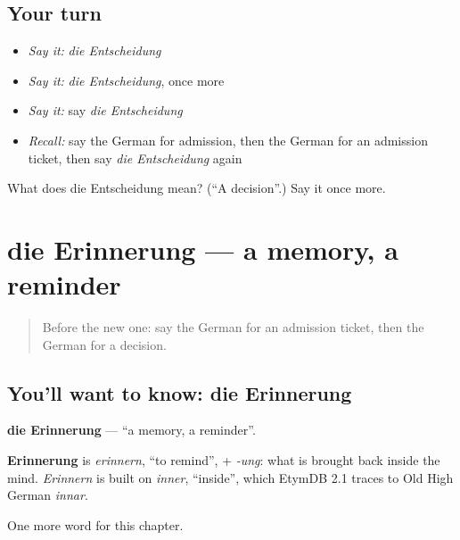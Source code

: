 \subsection*{Your turn}
\begin{itemize}
\raggedright
  \item \emph{Say it:} \emph{die Entscheidung}
  \item \emph{Say it:} \emph{die Entscheidung}, once more
  \item \emph{Say it:} say \emph{die Entscheidung}
  \item \emph{Recall:} say the German for admission, then the German for an admission ticket, then say \emph{die Entscheidung} again
\end{itemize}

\begin{tcolorbox}[breakable,colback=teal!4,colframe=teal!35!black,title={Before you move on}]
What does die Entscheidung mean? (\textquotedblleft{}A decision\textquotedblright{}.) Say it once more.
\end{tcolorbox}
\section[die Erinnerung]{die Erinnerung — a memory, a reminder}

\label{lesson:GE-C228-erinnerung}



\begin{quote}
Before the new one: say the German for an admission ticket, then the German for a decision.
\end{quote}

\subsection*{You'll want to know: die Erinnerung}
\textbf{die Erinnerung} — \textquotedblleft{}a memory, a reminder\textquotedblright{}.

\begin{cousinweb}
\textbf{Erinnerung} is \emph{erinnern}, \textquotedblleft{}to remind\textquotedblright{}, + \emph{-ung}: what is brought back inside the mind. \emph{Erinnern} is built on \emph{inner}, \textquotedblleft{}inside\textquotedblright{}, which EtymDB 2.1 traces to Old High German \emph{innar}.
\end{cousinweb}

\begin{grammarlens}[title={What you've built}]
One more word for this chapter.
\end{grammarlens}


